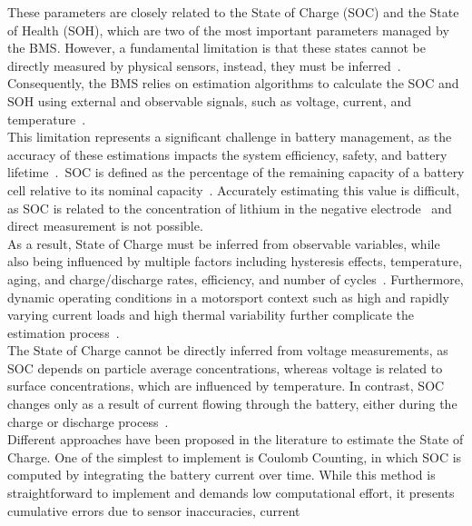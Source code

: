 These parameters are closely related to the State of Charge (\acs{SOC}) and the State of Health (\acs{SOH}), which are
two of the most important parameters managed by the \acs{BMS}.
However, a fundamental limitation is that these states cannot be directly measured by physical sensors, instead, they must be 
inferred~\cite{EKFEV}. 
Consequently, the \acs{BMS} relies on estimation algorithms to calculate the \acs{SOC} and \acs{SOH} using external and 
observable signals, such as voltage, current, and temperature~\cite{BatteryKalmanRaceCar}.
\\
This limitation represents a significant challenge in battery management, as the accuracy of these estimations impacts the system 
efficiency, safety, and battery lifetime~\cite{UKFDynamPar}.~\acs{SOC} is defined as the percentage of the remaining capacity of a battery
cell relative to its nominal capacity~\cite{EKFEV}. Accurately estimating this value 
is difficult, as \acs{SOC} is related to the concentration of lithium in the negative electrode~\cite{plett2015battery} 
and direct measurement is not possible. 
\\
As a result, State of Charge must be inferred from observable variables, while also being influenced
by multiple factors including hysteresis effects, temperature, aging, and charge/discharge rates, efficiency, and 
number of cycles~\cite{UKFDynamPar}.
Furthermore, dynamic operating conditions in a motorsport context such as high and rapidly varying current loads and high 
thermal variability further complicate the estimation process~\cite{plett2015battery}.
\\
The State of Charge cannot be directly inferred from voltage measurements, as \acs{SOC} depends on particle average concentrations, 
whereas voltage is related to surface concentrations, which are influenced by temperature. 
In contrast, \acs{SOC} changes only as a result of current flowing through the battery, either during the charge 
or discharge process~\cite{plett2015battery}.
\\
Different approaches have been proposed in the literature to estimate the State of Charge. One of the simplest to implement
is Coulomb Counting, in which \acs{SOC} is computed by integrating the battery current over time. While this method is 
straightforward to implement and demands low computational effort, it presents cumulative errors due to sensor inaccuracies, current
